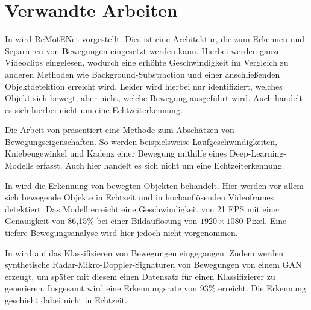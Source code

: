 \chapter{Verwandte Arbeiten}
In \cite{yu2018remotenet} wird ReMotENet vorgestellt. Dies ist eine Architektur,
die zum Erkennen und Separieren von Bewegungen eingesetzt werden kann. Hierbei
werden ganze Videoclips eingelesen, wodurch eine erhöhte Geschwindigkeit im
Vergleich zu anderen Methoden wie Background-Substraction und einer
anschließenden Objektdetektion erreicht wird. Leider wird hierbei nur
identifiziert, welches Objekt sich bewegt, aber nicht, welche Bewegung
ausgeführt wird. Auch handelt es sich hierbei nicht um eine Echtzeiterkennung.

Die Arbeit von \cite{kidzinksi2020} präsentiert eine Methode zum Abschätzen von
Bewegungseigenschaften. So werden beispielsweise Laufgeschwindigkeiten,
Kniebeugewinkel und Kadenz einer Bewegung mithilfe eines Deep-Learning-Modells
erfasst. Auch hier handelt es sich nicht um eine Echtzeiterkennung.

In \cite{zhu2020} wird die Erkennung von bewegten Objekten behandelt. Hier
werden vor allem sich bewegende Objekte in Echtzeit und in hochauflösenden
Videoframes detektiert. Das Modell erreicht eine Geschwindigkeit von 21 FPS mit
einer Genauigkeit von 86,15\% bei einer Bildauflösung von $1920 \times 1080$
Pixel. Eine tiefere Bewegungsanalyse wird hier jedoch nicht vorgenommen.

In \cite{erol2020motion} wird auf das Klassifizieren von Bewegungen eingegangen.
Zudem werden synthetische Radar-Mikro-Doppler-Signaturen von Bewegungen von
einem GAN erzeugt, um später mit diesem einen Datensatz für einen Klassifizierer
zu generieren. Insgesamt wird eine Erkennungsrate von 93\% erreicht. Die
Erkennung geschieht dabei nicht in Echtzeit.